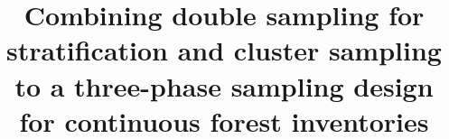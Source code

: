 %
%
%
%
%
%
%
\documentclass[referee]{svjour3}                     %
%
\smartqed  %
%
\usepackage{graphicx}
%
 \usepackage{mathptmx}      %
%
\usepackage[utf8x]{inputenc}
\usepackage{natbib}
\usepackage{multibib}

\usepackage{color}
\usepackage{rotating}
\setlength{\rotFPtop}{0pt plus 1fil}
\usepackage[breaklinks=true,draft=true]{hyperref}
\usepackage{amsmath}
\usepackage{multirow}
\usepackage{booktabs}
%

%


\title{Combining double sampling for stratification and cluster sampling to a three-phase sampling design for continuous forest inventories}

